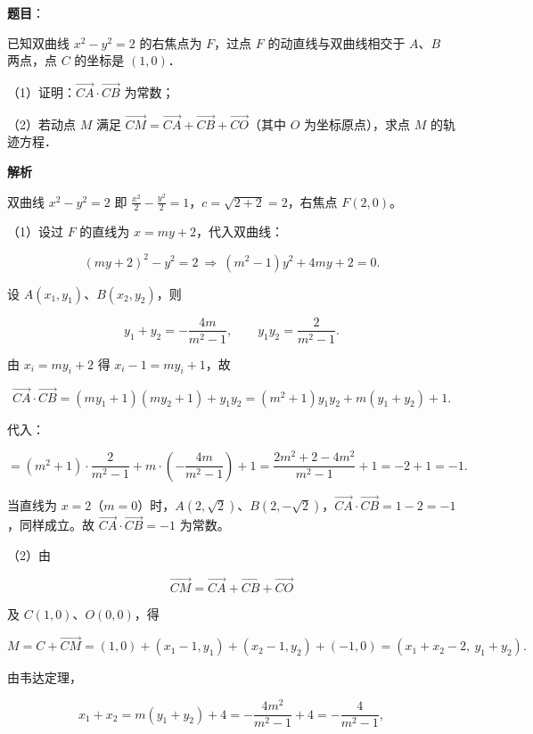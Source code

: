 \begin{answer}

\textbf{题目}：

已知双曲线 $x^2-y^2=2$ 的右焦点为 $F$，过点 $F$ 的动直线与双曲线相交于 $A$、$B$ 两点，点 $C$ 的坐标是 $(1,0)$．

（1）证明：$\overrightarrow{CA}\cdot\overrightarrow{CB}$ 为常数；

（2）若动点 $M$ 满足 $\overrightarrow{CM}=\overrightarrow{CA}+\overrightarrow{CB}+\overrightarrow{CO}$（其中 $O$ 为坐标原点），求点 $M$ 的轨迹方程．

\textbf{解析}

双曲线 $x^2-y^2=2$ 即 $\frac{x^2}{2}-\frac{y^2}{2}=1$，$c=\sqrt{2+2}=2$，右焦点 $F(2,0)$。

（1）设过 $F$ 的直线为 $x=my+2$，代入双曲线：

\nopagebreak[4]
\[(my+2)^2-y^2=2\ \Longrightarrow\ (m^2-1)y^2+4my+2=0 .\]

设 $A(x_1,y_1)$、$B(x_2,y_2)$，则

\nopagebreak[4]
\[y_1+y_2=-\frac{4m}{m^2-1},\qquad y_1y_2=\frac{2}{m^2-1}.\]

由 $x_i=my_i+2$ 得 $x_i-1=my_i+1$，故

\nopagebreak[4]
\[\overrightarrow{CA}\cdot\overrightarrow{CB}=(my_1+1)(my_2+1)+y_1y_2
=(m^2+1)y_1y_2+m(y_1+y_2)+1 .\]

代入：

\nopagebreak[4]
\[=(m^2+1)\cdot\frac{2}{m^2-1}+m\cdot\left(-\frac{4m}{m^2-1}\right)+1
=\frac{2m^2+2-4m^2}{m^2-1}+1=-2+1=-1 .\]

当直线为 $x=2$（$m=0$）时，$A(2,\sqrt2)$、$B(2,-\sqrt2)$，$\overrightarrow{CA}\cdot\overrightarrow{CB}=1-2=-1$，同样成立。故 $\overrightarrow{CA}\cdot\overrightarrow{CB}=-1$ 为常数。

（2）由

\nopagebreak[4]
\[\overrightarrow{CM}=\overrightarrow{CA}+\overrightarrow{CB}+\overrightarrow{CO}\]

及 $C(1,0)$、$O(0,0)$，得

\nopagebreak[4]
\[M=C+\overrightarrow{CM}=(1,0)+(x_1-1,y_1)+(x_2-1,y_2)+(-1,0)
=(x_1+x_2-2,\ y_1+y_2).\]

由韦达定理，

\nopagebreak[4]
\[x_1+x_2=m(y_1+y_2)+4=-\frac{4m^2}{m^2-1}+4=-\frac{4}{m^2-1},\]


\end{answer}
